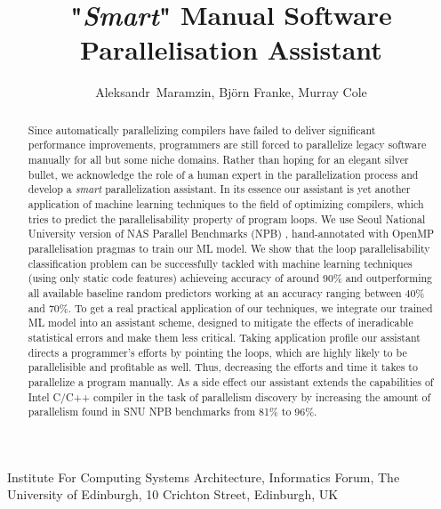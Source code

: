 \documentclass{acaces}
\begin{document}
\title{"\textit{Smart}" Manual Software Parallelisation Assistant}

\author{
Aleksandr~Maramzin,
Bj\"{o}rn Franke,
Murray Cole
}

\address{1}{
Institute For Computing Systems Architecture, 
Informatics Forum, 
The University of Edinburgh, 
10 Crichton Street, 
Edinburgh, 
UK
}


\pagestyle{empty}

\begin{abstract}
\quad Since automatically parallelizing compilers have failed to deliver significant performance improvements, programmers are still forced to parallelize legacy software manually for all but some niche domains. Rather than hoping for an elegant silver bullet, we acknowledge the role of a human expert in the parallelization process and develop a \textit{smart} parallelization assistant.\newline\null
\quad In its essence our assistant is yet another application of machine learning techniques to the field of optimizing compilers, which tries to predict the parallelisability property of program loops. We use Seoul National University version of NAS Parallel Benchmarks (NPB) \cite{nasa-parallel-benchmarks}, \cite{snu-npb-benchmarks} hand-annotated with OpenMP parallelisation pragmas to train our ML model. We show that the loop parallelisability classification problem can be successfully tackled with machine learning techniques (using only static code features) achieveing accuracy of around 90\% and outperforming all available baseline random predictors working at an accuracy ranging between 40\% and 70\%.\newline\null
\quad To get a real practical application of our techniques, we integrate our trained ML model into an assistant scheme, designed to mitigate the effects of ineradicable statistical errors and make them less critical. Taking application profile our assistant directs a programmer's efforts by pointing the loops, which are highly likely to be parallelisible and profitable as well. Thus, decreasing the efforts and time it takes to parallelize a program manually. As a side effect our assistant extends the capabilities of Intel C/C++ compiler in the task of parallelism discovery by increasing the amount of parallelism found in SNU NPB benchmarks from 81\% to 96\%.
\end{abstract}
\end{document}
